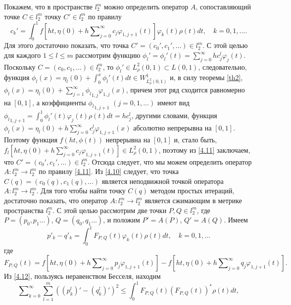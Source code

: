 Покажем, что в пространстве $l_2^m$ можно определить   оператор $A$, сопоставляющий точке $C\in l_2^m$ точку $C'\in l_2^m$ по правилу
\begin{equation}\label{4.11}
c_k'=\int_{0}^1f\left[ht,\eta(0)+ h\sum\nolimits_{j=0}^\infty c_j
\varphi_{1,j+1}(t)\right]\varphi_k(t)\rho(t) dt,\quad k=0,1,\ldots.
\end{equation}
Для этого достаточно показать, что точка $C'=(c_0',c_1',\ldots)\in l_2^m$. С этой целью для каждого $1\le l\le m$ рассмотрим функцию
$\phi_l'=\phi_l'(t)= \sum\nolimits_{j=0}^\infty hc_j^l\varphi_j(t)$. Поскольку $C=(c_0,c_1,\ldots)\in l_2^m$, то $\phi_l'\in L^2_\rho(0,1)\subset L(0,1)$, следовательно, функция $\phi_l(x)=\eta_l(0)+\int_0^x\phi_l'(t)dt\in W^1_{L^2_\rho(0,1)}$ и, в силу теоремы \ref{th2},  $\phi_l(x)=\eta_l(0)+\sum_{j=1}^\infty{\phi_l}_{1,j}\varphi_{1,j}(x)$, причем этот ряд сходится равномерно на $[0,1]$, а  коэффициенты ${\phi_l}_{1,j+1}$ $(j=0,1,\ldots)$ имеют вид
${\phi_l}_{1,j+1}=\int_0^1\phi_l'(t)\varphi_{j}(t)\rho(t)dt=hc_j^l$, другими словами, функция
$\phi_l(x)=\eta_l(0)+h\sum_{j=0}^\infty c_j^l\varphi_{1,j+1}(x)$ абсолютно непрерывна на $[0,1]$. Поэтому функция $f(ht,\phi(t))$ непрерывна на $[0,1]$ и, стало быть,
$f_l\left[ht,\eta(0)+ h\sum\nolimits_{j=0}^\infty c_j
\varphi_{1,j+1}(t)\right]\in L^2_\rho(0,1)$, поэтому\underline{} из \eqref{4.11} заключаем, что $C'=(c_0',c_1',\ldots)\in l_2^m$. Отсюда следует, что мы можем определить  оператор $A:l_2^m\to l_2^m$ по правилу \eqref{4.11}.
Из  \eqref{4.10} следует, что точка $C(q)=(c_0(q),c_1(q),\ldots)$ является неподвижной точкой оператора $A:l_2^m\to l_2^m$. Для того чтобы найти точку $C(q)$ методом простых итераций, достаточно показать, что оператор $A:l_2^m\to l_2^m$ является сжимающим в метрике пространства $l_2^m$. С этой целью рассмотрим две точки $P,Q\in l_2^m$, где $P=(p_0,p_1\ldots)$, $Q=(q_0,q_1\ldots)$, и положим $P'=A(P)$, $Q'=A(Q)$. Имеем
\begin{equation}\label{4.12}
p'_k-q'_k=\int_{0}^1F_{P,Q}(t)\varphi_k(t)\rho(t)dt,\quad k=0,1,\ldots
\end{equation}
где
\begin{equation}\label{4.13}
F_{P,Q}(t)=f\left[ht,\eta(0)+ h\sum\nolimits_{j=0}^\infty p_j\varphi_{1,j+1}(t)\right]
-f\left[ht,\eta(0)+ h\sum\nolimits_{j=0}^\infty q_j\varphi_{1,j+1}(t)\right].
\end{equation}
Из \eqref{4.12}, пользуясь неравенством Бесселя, находим
\begin{equation}\label{4.14}
\sum\nolimits_{k=0}^\infty \sum_{l=1}^m((p^l_k)'-(q^l_k)')^2\le\int_{0}^1F_{P,Q}(t)(F_{P,Q}(t))^*\rho(t) dt,
\end{equation}
